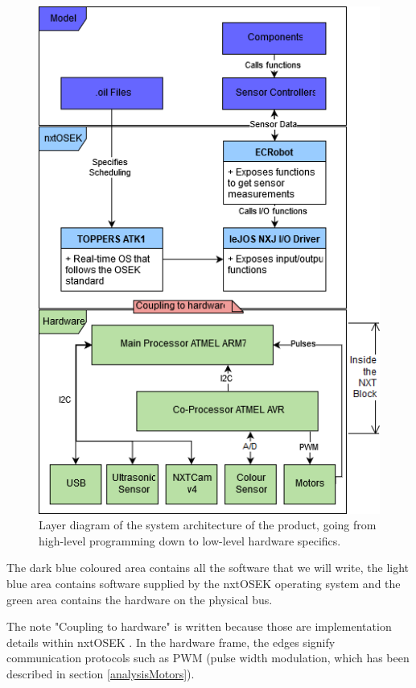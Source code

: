 \begin{figure}[H]
    \includegraphics[width=\textwidth]{Images/Design/abstractionLayerDiagram.png}
    \caption{Layer diagram of the system architecture of the product, going from high-level programming down to low-level hardware specifics.}
    \label{fig:abstractionLayers}
\end{figure}


The dark blue coloured area contains all the software that we will write, the light blue area contains software supplied by the nxtOSEK operating system and the green area contains the hardware on the physical bus. 

The note "Coupling to hardware" is written because those are implementation details within nxtOSEK . In the hardware frame, the edges signify communication protocols such as PWM (pulse width modulation, which has been described in section \ref{analysisMotors}). 
